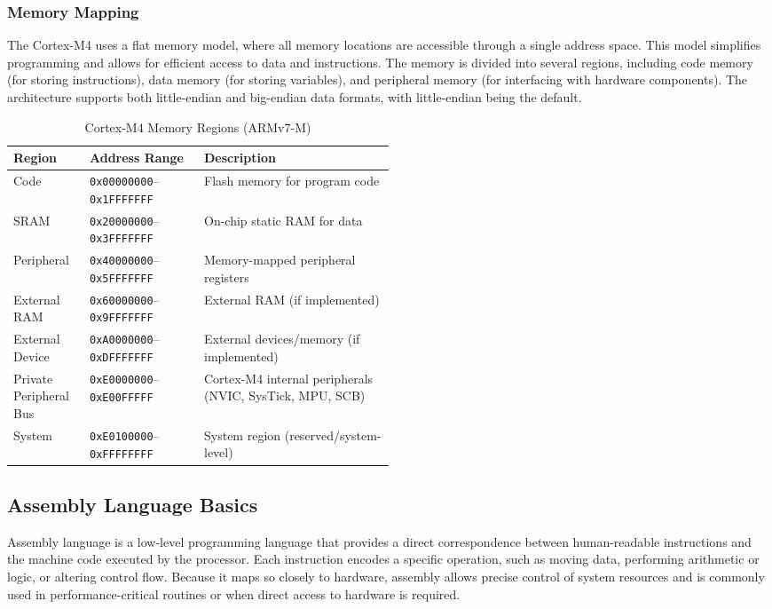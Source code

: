 \subsubsection{Memory Mapping}
The Cortex-M4 uses a flat memory model, where all memory locations are accessible through a single address space. This model simplifies programming and allows for efficient access to data and instructions. The memory is divided into several regions, including code memory (for storing instructions), data memory (for storing variables), and peripheral memory (for interfacing with hardware components). The architecture supports both little-endian and big-endian data formats, with little-endian being the default.
\begin{table}[H]
\centering
\caption{Cortex-M4 Memory Regions (ARMv7-M)}
\begin{tabularx}{\linewidth}{@{}p{0.20\linewidth}p{0.30\linewidth}X@{}}
\toprule
\textbf{Region} & \textbf{Address Range} & \textbf{Description} \\
\midrule
Code            & \texttt{0x00000000}--\texttt{0x1FFFFFFF} & Flash memory for program code \\[0.5ex]
SRAM            & \texttt{0x20000000}--\texttt{0x3FFFFFFF} & On-chip static RAM for data \\[0.5ex]
Peripheral      & \texttt{0x40000000}--\texttt{0x5FFFFFFF} & Memory-mapped peripheral registers \\[0.5ex]
External RAM    & \texttt{0x60000000}--\texttt{0x9FFFFFFF} & External RAM (if implemented) \\[0.5ex]
External Device & \texttt{0xA0000000}--\texttt{0xDFFFFFFF} & External devices/memory (if implemented) \\[0.5ex]
Private Peripheral Bus & \texttt{0xE0000000}--\texttt{0xE00FFFFF} & Cortex-M4 internal peripherals  (NVIC, SysTick, MPU, SCB)\\
System          & \texttt{0xE0100000}--\texttt{0xFFFFFFFF} & System region (reserved/system-level) \\
\bottomrule
\end{tabularx}
\end{table}


\subsection{Assembly Language Basics}

Assembly language is a low-level programming language that provides a direct correspondence between human-readable instructions and the machine code executed by the processor. Each instruction encodes a specific operation, such as moving data, performing arithmetic or logic, or altering control flow. Because it maps so closely to hardware, assembly allows precise control of system resources and is commonly used in performance-critical routines or when direct access to hardware is required.

